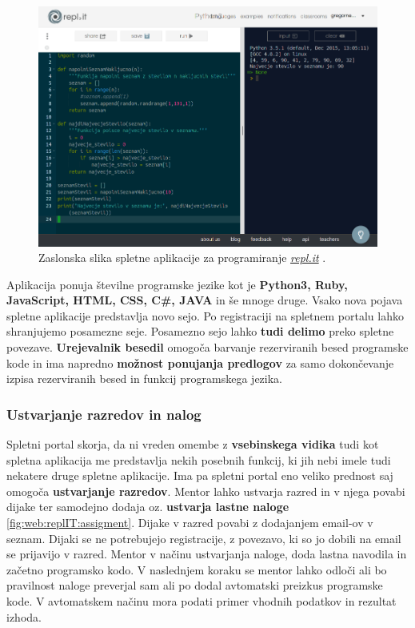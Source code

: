 \begin{figure}[h!]
  \centering
    \includegraphics [width=0.65\linewidth, keepaspectratio =
   1] {./images/sc_web/replIT_main-v01.png}
   \caption{Zaslonska slika spletne aplikacije za programiranje
     \emph{\href{https://repl.it/}{repl.it}} \cite{web:replIT}.}
    \label{fig:web:replIT}
\end{figure}

Aplikacija ponuja številne programske jezike kot je \textbf{Python3,
  Ruby, JavaScript, HTML, CSS, C\#, JAVA} in še mnoge druge. Vsako nova
pojava spletne aplikacije predstavlja novo sejo. Po registraciji na
spletnem portalu lahko shranjujemo posamezne seje. Posamezno sejo
lahko \textbf{tudi delimo} preko spletne povezave. \textbf{Urejevalnik
  besedil} omogoča barvanje rezerviranih besed programske kode in ima napredno
\textbf{možnost ponujanja predlogov} za samo dokončevanje izpisa
rezerviranih besed in funkcij programskega jezika.

\subsubsection{Ustvarjanje razredov in nalog}
\label{sec:ustvarjanje_raz_nalog}

Spletni portal skorja, da ni vreden omembe z \textbf{vsebinskega
  vidika} tudi kot spletna aplikacija me predstavlja nekih posebnih
funkcij, ki jih nebi imele tudi nekatere druge spletne aplikacije. Ima
pa spletni portal eno veliko prednost saj omogoča \textbf{ustvarjanje
  razredov}. Mentor lahko ustvarja razred in v njega povabi dijake ter
samodejno dodaja oz. \textbf{ustvarja lastne naloge}
\ref{fig:web:replIT:assigment}. Dijake v razred povabi z dodajanjem
email-ov v seznam. Dijaki se ne potrebujejo registracije, z povezavo,
ki so jo dobili na email se prijavijo v razred. Mentor v načinu
ustvarjanja naloge, doda lastna navodila in začetno programsko kodo. V
naslednjem koraku se mentor lahko odloči ali bo pravilnost naloge
preverjal sam ali po dodal avtomatski preizkus programske kode. V
avtomatskem načinu mora podati primer vhodnih podatkov in rezultat
izhoda.


